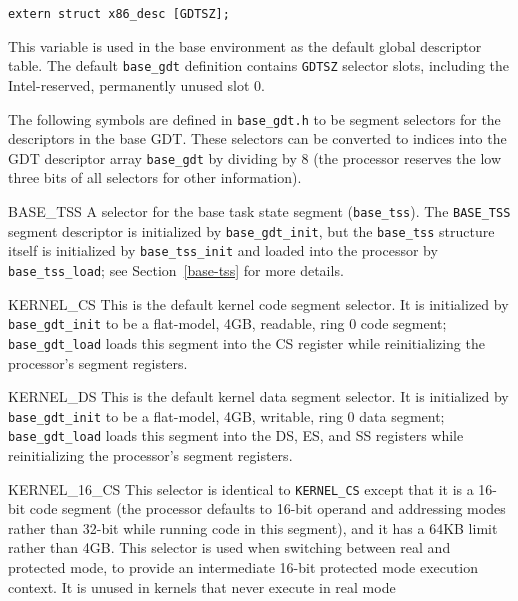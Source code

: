 \label{base-gdt}
\begin{apisyn}

	{\tt extern struct x86_desc [GDTSZ];}
\end{apisyn}
\begin{apidesc}
	This variable is used in the base environment
	as the default global descriptor table.
	The default {\tt base_gdt} definition
	contains {\tt GDTSZ} selector slots,
	including the Intel-reserved, permanently unused slot 0.

	The following symbols are defined in {\tt base_gdt.h}
	to be segment selectors for the descriptors in the base GDT\@.
	These selectors can be converted to indices
	into the GDT descriptor array {\tt base_gdt} by dividing by 8
	(the processor reserves the low three bits of all selectors
	for other information).
	\begin{icsymlist}
	\item[BASE_TSS]
		A selector for the base task state segment ({\tt base_tss}).
		The {\tt BASE_TSS} segment descriptor
		is initialized by {\tt base_gdt_init},
		but the {\tt base_tss} structure itself
		is initialized by {\tt base_tss_init}
		and loaded into the processor by {\tt base_tss_load};
		see Section~\ref{base-tss} for more details.
	\item[KERNEL_CS]
		This is the default kernel code segment selector.
		It is initialized by {\tt base_gdt_init}
		to be a flat-model, 4GB, readable, ring 0 code segment;
		{\tt base_gdt_load} loads this segment into the CS register
		while reinitializing the processor's segment registers.
	\item[KERNEL_DS]
		This is the default kernel data segment selector.
		It is initialized by {\tt base_gdt_init}
		to be a flat-model, 4GB, writable, ring 0 data segment;
		{\tt base_gdt_load} loads this segment
		into the DS, ES, and SS registers
		while reinitializing the processor's segment registers.
	\item[KERNEL_16_CS]
		This selector is identical to {\tt KERNEL_CS}
		except that it is a 16-bit code segment
		(the processor defaults to 16-bit operand and addressing modes
		rather than 32-bit while running code in this segment),
		and it has a 64KB limit rather than 4GB\@.
		This selector is used when switching
		between real and protected mode,
		to provide an intermediate 16-bit protected mode
		execution context.
		It is unused in kernels that never execute in real mode

\end{icsymlist}
\end{apidesc}
